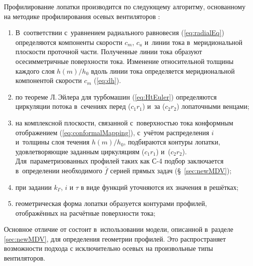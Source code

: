 Профилирование лопатки производится по следующему алгоритму, основанному на методике профилирования осевых вентиляторов \autocite{Brusilovskiy1986}:
\begin{enumerate}
	\item В~соответствии с~уравнением радиального равновесия (\ref{eq:radialEq}) определяются компоненты скорости \(c_m\), \(c_u\) и~линии тока в~меридиональной плоскости проточной части.
	Полученные линии тока образуют осесимметричные поверхности тока.
	Изменение относительной толщины каждого слоя \(h(m)/h_0\) вдоль линии тока определяется меридиональной компонентой скорости \(c_m\) (\ref{eq:dh}).

	\item по теореме Л.\,Эйлера для турбомашин (\ref{eq:HtEuler}) определяются циркуляции потока в~сечениях перед (\(c_1 r_1\)) и~за (\(c_2 r_2\)) лопаточными венцами;

	\item на комплексной плоскости, связанной с~поверхностью тока конформным отображением (\ref{eq:conformalMapping}), с~учётом распределения \(i\) и~толщины слоя течения \(h(m)/h_0\), подбираются контуры лопатки, удовлетворяющие заданным циркуляциям (\(c_1 r_1\)) и~(\(c_2 r_2\)).
    Для~параметризованных профилей таких как С-4 подбор заключается в~определении необходимого \(\bar{f}\) серией прямых задач (\S~\ref{sec:newMDV});

    \item при задании \(k_\Gamma\), \(i\) и \(\tau\) в виде функций уточняются их значения в решётках;

	\item геометрическая форма лопатки образуется контурами профилей, отображённых на расчётные поверхности тока;
\end{enumerate}

Основное отличие от \autocite{Brusilovskiy1986} состоит в~использовании модели, описанной в~разделе \ref{sec:newMDV}, для определения геометрии профилей.
Это распространяет возможности подхода \autocite{Brusilovskiy1986} с исключительно осевых на произвольные типы вентиляторов.


